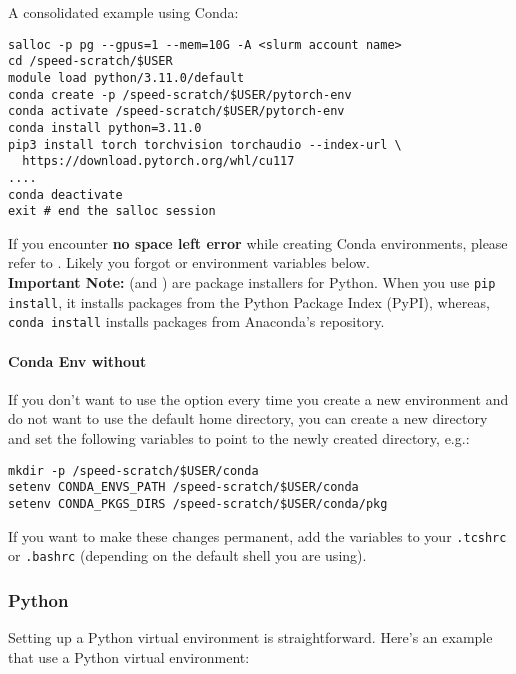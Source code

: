 \documentclass{easychair}
\begin{document}
\noindent
A consolidated example using Conda:
\begin{verbatim}
salloc -p pg --gpus=1 --mem=10G -A <slurm account name>
cd /speed-scratch/$USER
module load python/3.11.0/default
conda create -p /speed-scratch/$USER/pytorch-env
conda activate /speed-scratch/$USER/pytorch-env
conda install python=3.11.0
pip3 install torch torchvision torchaudio --index-url \ 
  https://download.pytorch.org/whl/cu117
....
conda deactivate
exit # end the salloc session
\end{verbatim}

\noindent
If you encounter \textbf{no space left error} while creating Conda environments, please refer to
\xa{sect:quota-exceeded}. Likely you forgot \option{--prefix} or environment variables below.\\

\noindent
\textbf{Important Note:}  (and ) are package installers for Python. When you use
\texttt{pip install}, it installs packages from the Python Package Index (PyPI), whereas, 
\texttt{conda install} installs packages from Anaconda's repository.

\paragraph{Conda Env without }

If you don't want to use the \option{--prefix} option every time you create a new environment and 
do not want to use the default home directory, you can create a new directory and set the following 
variables to point to the newly created directory, e.g.:
\begin{verbatim}
mkdir -p /speed-scratch/$USER/conda
setenv CONDA_ENVS_PATH /speed-scratch/$USER/conda
setenv CONDA_PKGS_DIRS /speed-scratch/$USER/conda/pkg
\end{verbatim}
\noindent
If you want to make these changes permanent, add the variables to your \texttt{.tcshrc} 
or \texttt{.bashrc} (depending on the default shell you are using).

\subsubsection{Python}
\label{sect:python-venv}

Setting up a Python virtual environment is straightforward.
Here's an example that use a Python virtual environment:
\end{document}
